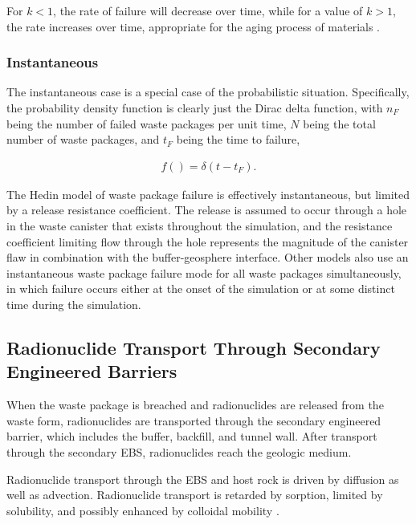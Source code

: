 For $k<1$, the rate of failure will decrease over time, while for a value of 
$k>1$, the rate increases over time, appropriate for the aging process of 
materials  \cite{papoulis_probability_2002}.



\subsubsection{Instantaneous}

The instantaneous case is a special case of the probabilistic situation.
Specifically, the probability density function is clearly just the Dirac 
delta function, with $n_F$ being the number of failed waste packages per 
unit time, $N$ being the total number of waste packages, and $t_F$ being 
the time to failure,

\begin{align}
  f()= \delta(t-t_F).
  \label{instantaneous}
\end{align}


The Hedin model of waste package failure is effectively instantaneous, but
limited by a release resistance coefficient. The release is assumed  to occur
through a hole in the waste canister that exists throughout the simulation, and
the resistance coefficient limiting flow through the hole represents the
magnitude of the canister flaw in combination with the buffer-geosphere
interface\cite{hedin_integrated_2002}.  Other models also use an instantaneous 
waste package failure mode for all waste  packages simultaneously, in which 
failure occurs either at the onset of the simulation or at some distinct time 
during the simulation. 




\subsection{Radionuclide Transport Through Secondary Engineered Barriers}

When the waste package is breached and radionuclides are released from the waste 
form, radionuclides are transported through the secondary engineered barrier, 
which includes the buffer, backfill, and tunnel wall. After transport through 
the secondary \gls{EBS}, radionuclides reach the geologic medium. 

Radionuclide transport through the \gls{EBS} and host rock is driven by 
diffusion as well as advection. Radionuclide transport is retarded by sorption, 
limited by solubility, and possibly enhanced by colloidal mobility 
\cite{bracke_safety_2008}. 

